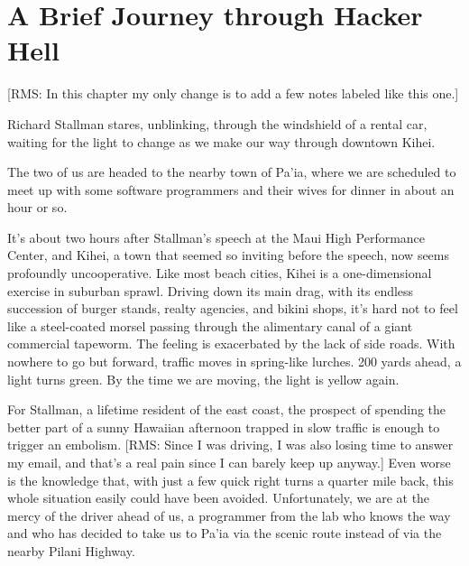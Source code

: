 

\chapter{A Brief Journey through Hacker Hell}

[RMS: In this chapter my only change is to add a few notes labeled like
this one.]


Richard Stallman stares, unblinking, through the windshield of a rental car, waiting for the light to change as we make our way through downtown Kihei.

The two of us are headed to the nearby town of Pa'ia, where we are scheduled to meet up with some software programmers and their wives for dinner in about an hour or so.

It's about two hours after Stallman's speech at the Maui High Performance Center, and Kihei, a town that seemed so inviting before the speech, now seems profoundly uncooperative. Like most beach cities, Kihei is a one-dimensional exercise in suburban sprawl. Driving down its main drag, with its endless succession of burger stands, realty agencies, and bikini shops, it's hard not to feel like a steel-coated morsel passing through the alimentary canal of a giant commercial tapeworm. The feeling is exacerbated by the lack of side roads. With nowhere to go but forward, traffic moves in spring-like lurches. 200 yards ahead, a light turns green. By the time we are moving, the light is yellow again.

For Stallman, a lifetime resident of the east coast, the prospect of spending the better part of a sunny Hawaiian afternoon trapped in slow traffic is enough to trigger an embolism. [RMS: Since I was driving, I was also losing time to answer my email, and that's a real pain since I can barely keep up anyway.] Even worse is the knowledge that, with just a few quick right turns a quarter mile back, this whole situation easily could have been avoided. Unfortunately, we are at the mercy of the driver ahead of us, a programmer from the lab who knows the way and who has decided to take us to Pa'ia via the scenic route instead of via the nearby Pilani Highway.

